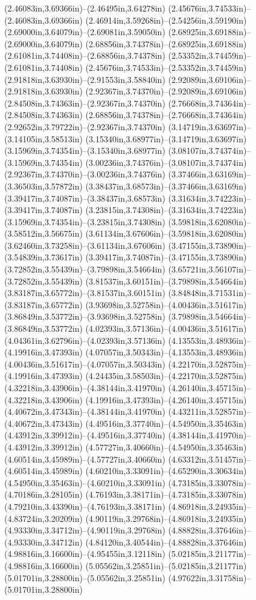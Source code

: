 (2.46083in,3.69366in)--(2.46495in,3.64278in) (2.45676in,3.74533in)--(2.46083in,3.69366in) (2.46914in,3.59268in)--(2.54256in,3.59190in) (2.69000in,3.64079in)--(2.69081in,3.59050in) (2.68925in,3.69188in)--(2.69000in,3.64079in) (2.68856in,3.74378in)--(2.68925in,3.69188in) (2.61081in,3.74408in)--(2.68856in,3.74378in) (2.53352in,3.74459in)--(2.61081in,3.74408in) (2.45676in,3.74533in)--(2.53352in,3.74459in) (2.91818in,3.63930in)--(2.91553in,3.58840in) (2.92089in,3.69106in)--(2.91818in,3.63930in) (2.92367in,3.74370in)--(2.92089in,3.69106in) (2.84508in,3.74363in)--(2.92367in,3.74370in) (2.76668in,3.74364in)--(2.84508in,3.74363in) (2.68856in,3.74378in)--(2.76668in,3.74364in) (2.92652in,3.79722in)--(2.92367in,3.74370in) (3.14719in,3.63697in)--(3.14105in,3.58513in) (3.15340in,3.68977in)--(3.14719in,3.63697in) (3.15969in,3.74354in)--(3.15340in,3.68977in) (3.08107in,3.74374in)--(3.15969in,3.74354in) (3.00236in,3.74376in)--(3.08107in,3.74374in) (2.92367in,3.74370in)--(3.00236in,3.74376in) (3.37466in,3.63169in)--(3.36503in,3.57872in) (3.38437in,3.68573in)--(3.37466in,3.63169in) (3.39417in,3.74087in)--(3.38437in,3.68573in) (3.31634in,3.74223in)--(3.39417in,3.74087in) (3.23815in,3.74308in)--(3.31634in,3.74223in) (3.15969in,3.74354in)--(3.23815in,3.74308in) (3.59818in,3.62080in)--(3.58512in,3.56675in) (3.61134in,3.67606in)--(3.59818in,3.62080in) (3.62460in,3.73258in)--(3.61134in,3.67606in) (3.47155in,3.73890in)--(3.54839in,3.73617in) (3.39417in,3.74087in)--(3.47155in,3.73890in) (3.72852in,3.55439in)--(3.79898in,3.54664in) (3.65721in,3.56107in)--(3.72852in,3.55439in) (3.81537in,3.60151in)--(3.79898in,3.54664in) (3.83187in,3.65772in)--(3.81537in,3.60151in) (3.84848in,3.71531in)--(3.83187in,3.65772in) (3.93698in,3.52758in)--(4.00436in,3.51617in) (3.86849in,3.53772in)--(3.93698in,3.52758in) (3.79898in,3.54664in)--(3.86849in,3.53772in) (4.02393in,3.57136in)--(4.00436in,3.51617in) (4.04361in,3.62796in)--(4.02393in,3.57136in) (4.13553in,3.48936in)--(4.19916in,3.47393in) (4.07057in,3.50343in)--(4.13553in,3.48936in) (4.00436in,3.51617in)--(4.07057in,3.50343in) (4.22170in,3.52875in)--(4.19916in,3.47393in) (4.24435in,3.58503in)--(4.22170in,3.52875in) (4.32218in,3.43906in)--(4.38144in,3.41970in) (4.26140in,3.45715in)--(4.32218in,3.43906in) (4.19916in,3.47393in)--(4.26140in,3.45715in) (4.40672in,3.47343in)--(4.38144in,3.41970in) (4.43211in,3.52857in)--(4.40672in,3.47343in) (4.49516in,3.37740in)--(4.54950in,3.35463in) (4.43912in,3.39912in)--(4.49516in,3.37740in) (4.38144in,3.41970in)--(4.43912in,3.39912in) (4.57727in,3.40660in)--(4.54950in,3.35463in) (4.60514in,3.45989in)--(4.57727in,3.40660in) (4.63312in,3.51457in)--(4.60514in,3.45989in) (4.60210in,3.33091in)--(4.65290in,3.30634in) (4.54950in,3.35463in)--(4.60210in,3.33091in) (4.73185in,3.33078in)--(4.70186in,3.28105in) (4.76193in,3.38171in)--(4.73185in,3.33078in) (4.79210in,3.43390in)--(4.76193in,3.38171in) (4.86918in,3.24935in)--(4.83724in,3.20209in) (4.90119in,3.29768in)--(4.86918in,3.24935in) (4.93330in,3.34712in)--(4.90119in,3.29768in) (4.88828in,3.37646in)--(4.93330in,3.34712in) (4.84120in,3.40544in)--(4.88828in,3.37646in) (4.98816in,3.16600in)--(4.95455in,3.12118in) (5.02185in,3.21177in)--(4.98816in,3.16600in) (5.05562in,3.25851in)--(5.02185in,3.21177in) (5.01701in,3.28800in)--(5.05562in,3.25851in) (4.97622in,3.31758in)--(5.01701in,3.28800in) 